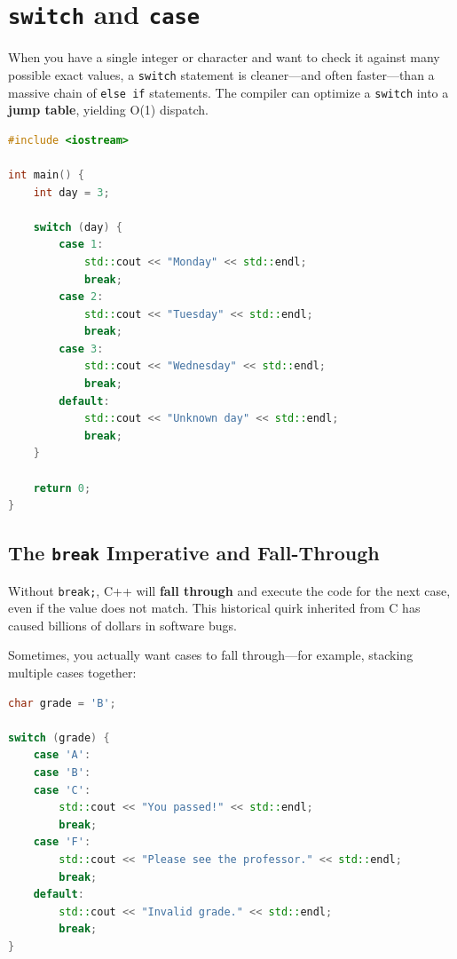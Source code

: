 \section{\texttt{switch} and \texttt{case}}
\label{sec:switch}

When you have a single integer or character and want to check it against many possible exact values, a \texttt{switch} statement is cleaner---and often faster---than a massive chain of \texttt{else if} statements. The compiler can optimize a \texttt{switch} into a \textbf{jump table}, yielding O(1) dispatch.

\begin{lstlisting}[language=C++, caption={Basic switch statement}]
#include <iostream>

int main() {
    int day = 3;

    switch (day) {
        case 1:
            std::cout << "Monday" << std::endl;
            break;
        case 2:
            std::cout << "Tuesday" << std::endl;
            break;
        case 3:
            std::cout << "Wednesday" << std::endl;
            break;
        default:
            std::cout << "Unknown day" << std::endl;
            break;
    }

    return 0;
}
\end{lstlisting}

\subsection{The \texttt{break} Imperative and Fall-Through}

Without \texttt{break;}, C++ will \textbf{fall through} and execute the code for the next case, even if the value does not match. This historical quirk inherited from C has caused billions of dollars in software bugs.

Sometimes, you actually want cases to fall through---for example, stacking multiple cases together:

\begin{lstlisting}[language=C++, caption={Intentional fall-through in switch}]
char grade = 'B';

switch (grade) {
    case 'A':
    case 'B':
    case 'C':
        std::cout << "You passed!" << std::endl;
        break;
    case 'F':
        std::cout << "Please see the professor." << std::endl;
        break;
    default:
        std::cout << "Invalid grade." << std::endl;
        break;
}
\end{lstlisting}

